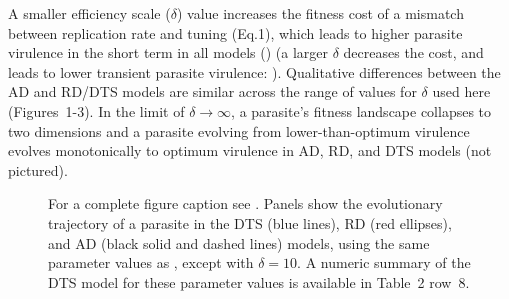 A smaller efficiency scale ($\delta$) value increases the fitness cost of a mismatch between replication rate and tuning (Eq.1), which leads to higher parasite virulence in the short term in all models () (a larger $\delta$ decreases the cost, and leads to lower transient parasite virulence: ). Qualitative differences between the AD and RD/DTS models are similar across the range of values for $\delta$ used here (Figures~1-3). In the limit of $\delta \rightarrow \infty$, a parasite's fitness landscape collapses to two dimensions and a parasite evolving from lower-than-optimum virulence evolves monotonically to optimum virulence in AD, RD, and DTS models (not pictured). 

\begin{figure}[H]
\caption{For a complete figure caption see . Panels show the evolutionary trajectory of a parasite in the DTS (blue lines), RD (red ellipses), and AD (black solid and dashed lines) models, using the same parameter values as , except with $\delta = 10$. A numeric summary of the DTS model for these parameter values is available in Table~2 row~8.} 
\label{fig:landscape2}
\end{figure} 
\clearpage

